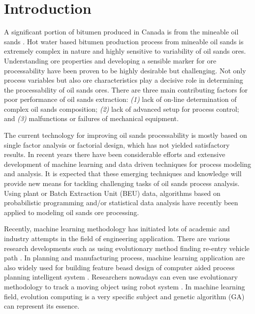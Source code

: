 \documentclass[final,5p,times,twocolumn]{elsarticle}
\begin{document}

\section{Introduction}
\label{sec1}

A significant portion of bitumen produced in Canada is from the mineable oil sands \cite{masliyah2004understanding}. Hot water based bitumen production process from mineable oil sands is extremely complex in nature and highly sensitive to variability of oil sands ores. Understanding ore properties and developing a sensible marker for ore processability have been proven to be highly desirable but challenging. Not only process variables but also ore characteristics play a decisive role in determining the processability of oil sands ores. There are three main contributing factors for poor performance of oil sands extraction\cite{Fong2004}: \emph{(1)} lack of on-line determination of complex oil sands composition; \emph{(2)} lack of advanced setup for process control; and \emph{(3)} malfunctions or failures of mechanical equipment.

The current technology for improving oil sands processability is mostly based on single factor analysis or factorial design, which has not yielded satisfactory results. In recent years there have been considerable efforts and extensive development of machine learning and data driven techniques for process modeling and analysis. It is expected that these emerging techniques and knowledge will provide new means for tackling challenging tasks of oil sands process analysis. Using plant or Batch Extraction Unit (BEU) data, algorithms based on probabilistic programming and/or statistical data analysis have recently been applied to modeling oil sands ore processing\cite{zhang2004artificial}.

Recently, machine learning methodology has initiated lots of academic and industry attempts in the field of engineering application. There are various research developments such as using evolutionary method finding re-entry vehicle path \cite{sushnigdha2017evolutionary}. In planning and manufacturing process, machine learning application are also widely used for building feature beasd design of computer aided process planning intelligent system \cite{kumar2017state}. Researchers nowadays can even use evolutionary methodology to track a moving object using robot system \cite{sangdani2018genetic}. In machine learning field, evolution computing is a very specific subject and genetic algorithm (GA) can represent its essence.
\end{document}
